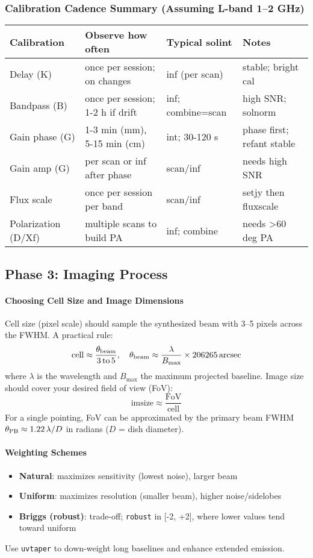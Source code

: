 \documentclass[11pt]{article}
\begin{document}
\subsubsection{Calibration Cadence Summary (Assuming L-band 1--2 GHz)}
\begin{table}[h]
\centering
\begin{tabular}{llll}
\toprule
Calibration & Observe how often & Typical solint & Notes \\
\midrule
Delay (K) & once per session; on changes & inf (per scan) & stable; bright cal \\
Bandpass (B) & once per session; 1-2 h if drift & inf; combine=scan & high SNR; solnorm \\
Gain phase (G) & 1-3 min (mm), 5-15 min (cm) & int; 30-120 s & phase first; refant stable \\
Gain amp (G) & per scan or inf after phase & scan/inf & needs high SNR \\
Flux scale & once per session per band & scan/inf & setjy then fluxscale \\
Polarization (D/Xf) & multiple scans to build PA & inf; combine & needs >60 deg PA \\
\bottomrule
\end{tabular}
\end{table}

\subsection{Phase 3: Imaging Process}

\paragraph{Choosing Cell Size and Image Dimensions}
Cell size (pixel scale) should sample the synthesized beam with 3--5 pixels across the FWHM. A practical rule:
\[ \text{cell} \approx \frac{\theta_{\rm beam}}{3\,\text{to}\,5}, \quad \theta_{\rm beam} \approx \frac{\lambda}{B_{\max}} \times 206265\,\text{arcsec} \]
where \(\lambda\) is the wavelength and \(B_{\max}\) the maximum projected baseline. Image size should cover your desired field of view (FoV):
\[ \text{imsize} \approx \frac{\text{FoV}}{\text{cell}} \]
For a single pointing, FoV can be approximated by the primary beam FWHM \(\theta_{\rm PB} \approx 1.22\,\lambda/D\) in radians (\(D\) = dish diameter).

\paragraph{Weighting Schemes}
\begin{itemize}
    \item \textbf{Natural}: maximizes sensitivity (lowest noise), larger beam
    \item \textbf{Uniform}: maximizes resolution (smaller beam), higher noise/sidelobes
    \item \textbf{Briggs (robust)}: trade-off; \texttt{robust} in [-2, +2], where lower values tend toward uniform
\end{itemize}
Use \texttt{uvtaper} to down-weight long baselines and enhance extended emission.
\end{document}
